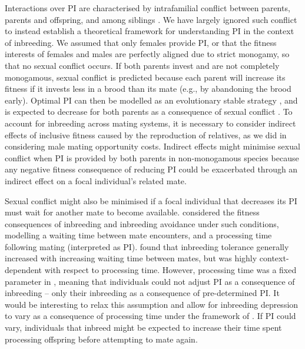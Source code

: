 \documentclass[12pt]{article}
\begin{document}
Interactions over PI are characterised by intrafamilial conflict between parents, parents and offspring, and among siblings \cite[][]{Parker2002}. We have largely ignored such conflict to instead establish a theoretical framework for understanding PI in the context of inbreeding. We assumed that only females provide PI, or that the fitness interests of females and males are perfectly aligned due to strict monogamy, so that no sexual conflict occurs. If both parents invest and are not completely monogamous, sexual conflict is predicted because each parent will increase its fitness if it invests less in a brood than its mate (e.g., by abandoning the brood early). Optimal PI can then be modelled as an evolutionary stable strategy \cite[][]{Smith1977}, and is expected to decrease for both parents as a consequence of sexual conflict \cite[][]{Parker1985}. To account for inbreeding across mating systems, it is necessary to consider indirect effects of inclusive fitness caused by the reproduction of relatives, as we did in considering male mating opportunity costs. Indirect effects might minimise sexual conflict when PI is provided by both parents in non-monogamous species because any negative fitness consequence of reducing PI could be exacerbated through an indirect effect on a focal individual's related mate. 

Sexual conflict might also be minimised if a focal individual that decreases its PI must wait for another mate to become available. \cite{Kokko2006} considered the fitness consequences of inbreeding and inbreeding avoidance under such conditions, modelling a waiting time between mate encounters, and a processing time following mating (interpreted as PI). \cite{Kokko2006} found that inbreeding tolerance generally increased with increasing waiting time between mates, but was highly context-dependent with respect to processing time. However, processing time was a fixed parameter in \cite{Kokko2006}, meaning that individuals could not adjust PI as a consequence of inbreeding -- only their inbreeding as a consequence of pre-determined PI. It would be interesting to relax this assumption and allow for inbreeding depression to vary as a consequence of processing time under the framework of \cite{Kokko2006}. If PI could vary, individuals that inbreed might be expected to increase their time spent processing offspring before attempting to mate again.
\end{document}
